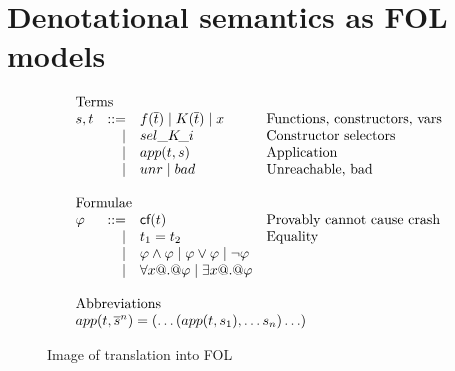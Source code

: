 \documentclass[preprint,nocopyrightspace]{sigplanconf}
\begin{document}

\section{Denotational semantics as FOL models} 
\newcommand{\linterp}[1]{{\cal I}(#1)}
\newcommand{\lassign}[1]{\mu(#1)}


\begin{figure}
\[\begin{array}{c} 
\begin{array}{lrll}
\multicolumn{3}{l}{\text{Terms}} \\
  s,t & ::=  & f(\ol{t}) \mid K(\ol{t}) \mid x & \text{Functions, constructors, vars} \\
      & \mid & \sel{K}{i}                      & \text{Constructor selectors} \\ 
      & \mid & app(t,s)                        & \text{Application} \\
      & \mid & \unr \mid \bad                  & \text{Unreachable, bad} \\ \\ 
\multicolumn{3}{l}{\text{Formulae}} \\ 
 \phi & ::=  & \lcf{t}    & \text{Provably cannot cause crash} \\
      & \mid & t_1 = t_2  & \text{Equality} \\ 
      & \mid & \phi \land \phi \mid \phi \lor \phi \mid \neg \phi \\
      & \mid & \forall x @.@ \phi \mid \exists x @.@ \phi \\ \\ 
\multicolumn{3}{l}{\text{Abbreviations}} \\ 
\multicolumn{4}{l}{app(t,\oln{s}{n}) = (\ldots(app(t,s_1),\ldots s_n)\ldots)}
\end{array}
\end{array}\]
\caption{Image of translation into FOL}\label{fig:fol-image}
\end{figure}

\newcommand{\elab}[1]{\rightsquigarrow \formula{#1}}
\end{document}
